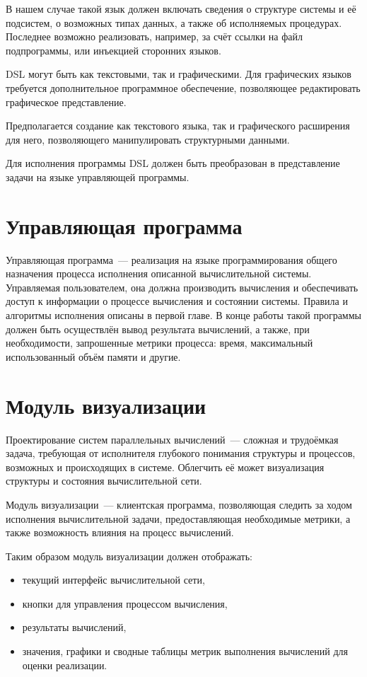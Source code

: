 В нашем случае такой язык должен включать сведения о структуре системы и её подсистем, о возможных типах данных, а также об исполняемых процедурах. 
Последнее возможно реализовать, например, за счёт ссылки на файл подпрограммы, или инъекцией сторонних языков.

DSL могут быть как текстовыми, так и графическими. 
Для графических языков требуется дополнительное программное обеспечение, позволяющее редактировать графическое представление.

Предполагается создание как текстового языка, так и графического расширения \cite{sprinkle2004domain} для него, позволяющего манипулировать структурными данными.

Для исполнения программы DSL должен быть преобразован в представление задачи на языке управляющей программы.
\section{Управляющая программа}

Управляющая программа~--- реализация на языке программирования общего назначения процесса исполнения описанной вычислительной системы.
Управляемая пользователем, она должна производить вычисления и обеспечивать доступ к информации о процессе вычисления и состоянии системы.
Правила и алгоритмы исполнения описаны в первой главе.
В конце работы такой программы должен быть осуществлён вывод результата вычислений, а также, при необходимости, запрошенные метрики процесса: время, максимальный использованный объём памяти и другие.


\section{Модуль визуализации}
Проектирование систем параллельных вычислений~--- сложная и трудоёмкая задача, требующая от исполнителя глубокого понимания структуры и процессов, возможных и происходящих в системе. 
Облегчить её может визуализация структуры и состояния вычислительной сети.

Модуль визуализации~--- клиентская программа, позволяющая следить за ходом исполнения вычислительной задачи, предоставляющая необходимые метрики, а также возможность влияния на процесс вычислений.

Таким образом модуль визуализации должен отображать:
\begin{itemize}
	\item текущий интерфейс вычислительной сети,
	\item кнопки для управления процессом вычисления,
	\item результаты вычислений,
	\item значения, графики и сводные таблицы метрик выполнения вычислений для оценки реализации.
\end{itemize}


